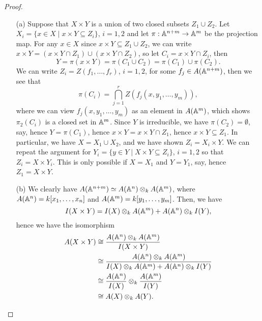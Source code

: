 \documentclass{article}
\begin{document}
\begin{enumerate} [label=\textbf{\arabic*.}, leftmargin=-0.05em]
\newpage

\begin{proof} $ $ \vspace{0pt}
    \begin{itemize} [leftmargin=0cm]
        \item[(a)] Suppose that $X \times Y$ is a union of two closed subsets $Z_1 \cup Z_2$.
        Let $X_i = \{ x \in X \mid x \times Y \subseteq Z_i \}$, $i = 1, 2$ and let $\pi : \mathbb{A}^{n + m} \to \mathbb{A}^m$ be the projection map.
        For any $x \in X$ since $x \times Y \subseteq Z_1 \cup Z_2$, we can write $x \times Y = (x \times Y \cap Z_1) \cup (x \times Y \cap Z_2)$, so let $C_i = x \times Y \cap Z_i$, then
        \begin{equation*}
            Y = \pi(x \times Y) = \pi(C_1 \cup C_2) = \pi(C_1) \cup \pi(C_2).
        \end{equation*}
        We can write $Z_i = Z(f_1, \dots, f_r)$, $i = 1, 2$, for some $f_j \in A(\mathbb{A}^{n + m})$, then we see that
        \begin{equation*}
            \pi(C_i) = \bigcap_{j = 1}^r Z(f_j(x, y_1, \dots, y_m)),
        \end{equation*}
        where we can view $f_j(x, y_1, \dots, y_m)$ as an element in $A(\mathbb{A}^m)$, which shows $\pi_2(C_i)$ is a closed set in $\mathbb{A}^m$.
        Since $Y$ is irreducible, we have $\pi(C_2) = \emptyset$, say, hence $Y = \pi(C_1)$, hence $x \times Y = x \times Y \cap Z_1$, hence $x \times Y \subseteq Z_1$.
        In particular, we have $X = X_1 \cup X_2$, and we have shown $Z_i = X_i \times Y$.
        We can repeat the argument for $Y_i = \{y \in Y \mid X \times Y \subseteq Z_i\}$, $i = 1, 2$ so that $Z_i = X \times Y_i$.
        This is only possible if $X = X_1$ and $Y = Y_1$, say, hence $Z_1 = X \times Y$.
        

        \item[(b)] We clearly have $A(\mathbb{A}^{n + m}) \simeq A(\mathbb{A}^n) \otimes_k A(\mathbb{A}^m)$, where $A(\mathbb{A}^n) = k[x_1, \dots, x_n]$ and $A(\mathbb{A}^m) = k[y_1, \dots, y_m]$. Then, we have
        \begin{equation*}
            I(X \times Y) = I(X) \otimes_k A(\mathbb{A}^m) + A(\mathbb{A}^n) \otimes_k I(Y),
        \end{equation*}
        hence we have the isomorphism
        \begin{align*}
           A(X \times Y) & \cong \frac{A(\mathbb{A}^n) \otimes_k A(\mathbb{A}^m)}{I(X \times Y)} \\
           & \cong \frac{A(\mathbb{A}^n) \otimes_k A(\mathbb{A}^m)}{ I(X) \otimes_k A(\mathbb{A}^m) + A(\mathbb{A}^n) \otimes_k I(Y)} \\
           & \cong \frac{A(\mathbb{A}^n)}{I(X)} \otimes_k \frac{A(\mathbb{A}^m)}{I(Y)} \\
           & \cong A(X) \otimes_k A(Y).
        \end{align*}


\end{itemize}
\end{proof}
\end{enumerate}
\end{document}
